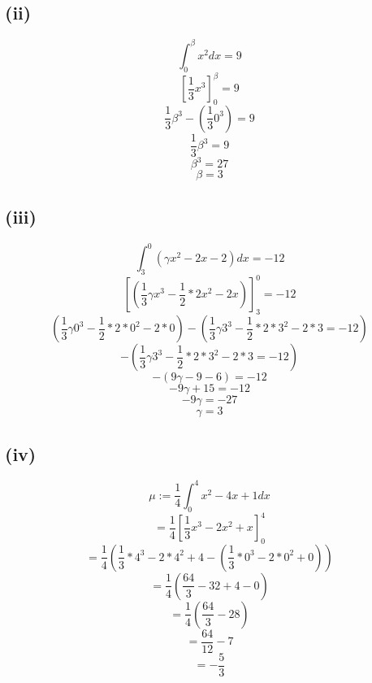 \documentclass{article}
\begin{document}
\subsection*{(ii)}
\[\int_0^\beta{x^2 dx}=9\]
\[[\frac{1}{3}x^3]_0^\beta = 9\]
\[\frac{1}{3}\beta^3-(\frac{1}{3}0^3)=9\]
\[\frac{1}{3}\beta^3=9\]
\[\beta^3=27\]
\[\beta=3\]

\subsection*{(iii)}
\[\int_3^0{(\gamma x^2-2x-2) dx}=-12\]
\[[(\frac{1}{3}\gamma x^3-\frac{1}{2}*2x^2-2x)]_3^0 = -12\]
\[(\frac{1}{3}\gamma 0^3-\frac{1}{2}*2*0^2-2*0)-(\frac{1}{3}\gamma 3^3-\frac{1}{2}*2*3^2-2*3=-12)\]
\[-(\frac{1}{3}\gamma 3^3-\frac{1}{2}*2*3^2-2*3=-12)\]
\[-(9\gamma -9-6)=-12\]
\[-9\gamma +15=-12\]
\[-9\gamma=-27\]
\[\gamma=3\]

\subsection*{(iv)}
\[\mu:=\frac{1}{4}\int_0^4{x^2-4x+1 dx}\]
\[=\frac{1}{4}[\frac{1}{3}x^3-2x^2+x]_0^4\]
\[=\frac{1}{4}(\frac{1}{3}*4^3-2*4^2+4-(\frac{1}{3}*0^3-2*0^2+0))\]
\[=\frac{1}{4}(\frac{64}{3}-32+4-0)\]
\[=\frac{1}{4}(\frac{64}{3}-28)\]
\[=\frac{64}{12}-7\]
\[= -\frac{5}{3}\]
\end{document}
